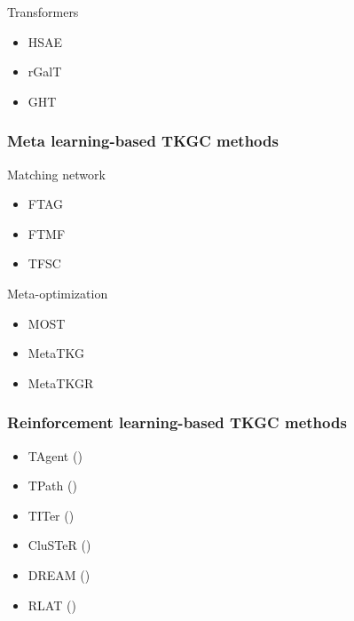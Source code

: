 \documentclass[12pt]{article}
\begin{document}
Transformers
\begin{itemize}
    \item HSAE
    \item rGalT
    \item GHT
\end{itemize}

\subsubsection{Meta learning-based TKGC methods}

Matching network 
\begin{itemize}
    \item FTAG
    \item FTMF
    \item TFSC
\end{itemize}

Meta-optimization
\begin{itemize}
    \item MOST
    \item MetaTKG
    \item MetaTKGR
\end{itemize}

\subsubsection{Reinforcement learning-based TKGC methods}

\begin{itemize}
    \item TAgent (\cite{tao2021temporal})
    \item TPath (\cite{bai2021multi})
    \item TITer (\cite{sun2021timetraveler})
    \item CluSTeR (\cite{li2021search})
    \item DREAM (\cite{zheng2023dream})
    \item RLAT (\cite{bai2023rlat})
\end{itemize}

\printbibliography
\end{document}
